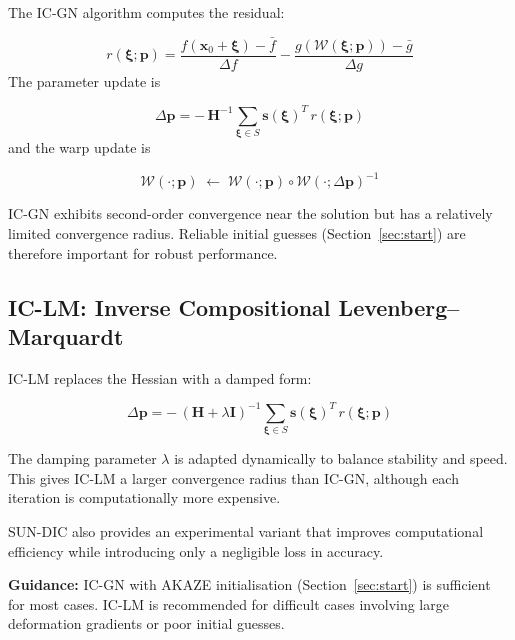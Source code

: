 The IC-GN algorithm computes the residual:

\begin{equation}
	r(\boldsymbol{\xi};\mathbf{p}) =
	\frac{f(\mathbf{x}_0+\boldsymbol{\xi}) - \bar{f}}{\Delta f}
	-
	\frac{g\!\left(\mathcal{W}(\boldsymbol{\xi};\mathbf{p})\right) - \bar{g}}{\Delta g}
\end{equation}
The parameter update is

\begin{equation}
	\label{eqn:icgn}
	\Delta\mathbf{p} = -\,\mathbf{H}^{-1}
	\sum_{\boldsymbol{\xi} \in S}
	\mathbf{s}(\boldsymbol{\xi})^T\,r(\boldsymbol{\xi};\mathbf{p})
\end{equation}
and the warp update is

\begin{equation}
	\label{eqn:warp_update}
	\mathcal{W}(\cdot;\mathbf{p})
	\;\leftarrow\;
	\mathcal{W}(\cdot;\mathbf{p}) \circ \mathcal{W}(\cdot;\Delta\mathbf{p})^{-1}
\end{equation}

IC-GN exhibits second-order convergence near the solution but has a relatively limited convergence radius. Reliable initial guesses (Section~\ref{sec:start}) are therefore important for robust performance.

\subsection{IC-LM: Inverse Compositional Levenberg--Marquardt}
\label{sec:iclm}

IC-LM replaces the Hessian with a damped form:

\begin{equation}
	\label{eqn:iclm}
	\Delta\mathbf{p} = -\,(\mathbf{H} + \lambda\mathbf{I})^{-1}
	\sum_{\boldsymbol{\xi} \in S}
	\mathbf{s}(\boldsymbol{\xi})^T\,r(\boldsymbol{\xi};\mathbf{p})
\end{equation}

The damping parameter $\lambda$ is adapted dynamically to balance stability and speed. This gives IC-LM a larger convergence radius than IC-GN, although each iteration is computationally more expensive.

SUN-DIC also provides an experimental  variant that improves computational efficiency while introducing only a negligible loss in accuracy.

\textbf{Guidance:} IC-GN with AKAZE initialisation (Section~\ref{sec:start}) is sufficient for most cases. IC-LM is recommended for difficult cases involving large deformation gradients or poor initial guesses.

